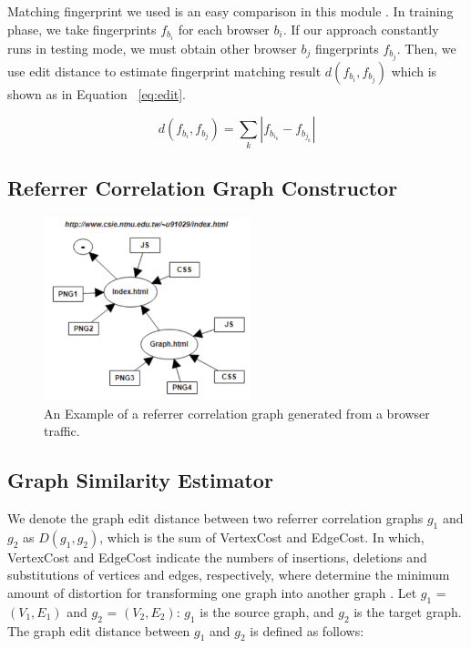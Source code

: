 Matching fingerprint we used is an easy comparison in this module \cite{bortolameotti2017decanter}. In training phase, we take fingerprints $f_{b_{i}}$ for each browser $b_{i}$. If our approach constantly runs in testing mode, we must obtain other browser $b_{j}$ fingerprints $f_{b_{j}}$. Then, we use edit distance to estimate fingerprint matching result $d(f_{b_{i}}, f_{b_{j}}) $ which is shown as in Equation ~\ref{eq:edit}.

\begin{equation}
        \label{eq:edit}
        d(f_{b_{i}}, f_{b_{j}}) = \sum_k \left |  f_{b_{i_{k}}} - f_{b_{j_{k}}} \right |  
\end{equation}

\subsection{Referrer Correlation Graph Constructor}

\begin{figure}[!t]
\centering
\includegraphics[width=170pt]{image/ref_graph.png}
\caption{An Example of a referrer correlation graph generated from a browser traffic.}
\label{fig:ref_graph}
\end{figure}

\subsection{Graph Similarity Estimator}

We denote the graph edit distance between two referrer correlation graphs $g_{1}$ and $g_{2}$ as $D(g_{1}, g_{2})$, which is the sum of VertexCost and EdgeCost. In which, VertexCost and EdgeCost indicate the numbers of insertions, deletions and substitutions of vertices and edges, respectively, where determine the minimum amount of distortion for transforming one graph into another graph  \cite{p:Fankhauser11}. Let $g_{1}$ = $(V_{1}, E_{1})$  and $g_{2}$ = $(V_{2}, E_{2})$: $g_{1}$ is the source graph, and $g_{2}$ is the target graph. The graph edit distance between $g_{1}$ and $g_{2}$ is defined as follows:


